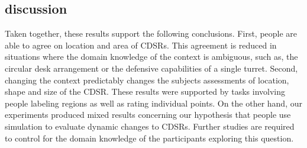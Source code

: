 \documentclass[11pt,letterpaper]{article}
\begin{document}
%
% 

%
%
%
 
\subsection{discussion}
Taken together, these results support the following conclusions. First, people are able to agree on location and area of CDSRs.  This agreement is reduced in situations where the domain knowledge of the context is ambiguous, such as, the circular desk arrangement or the defensive capabilities of a single turret.  Second, changing the context predictably changes the subjects assessments of location, shape and size of the CDSR.  These results were supported by tasks involving people labeling regions as well as rating individual points.  On the other hand, our experiments produced mixed results concerning our hypothesis that people use simulation to evaluate dynamic changes to CDSRs.  Further studies are required to control for the domain knowledge of the participants exploring this question.
\end{document}
